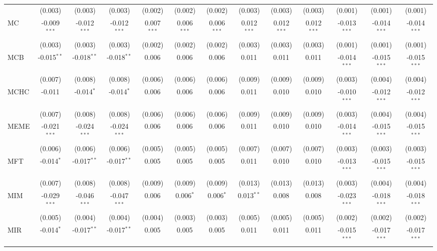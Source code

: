 \begin{table}[!htbp]
\begin{tabular}{@{\extracolsep{5pt}}lcccccccccccc}
  & (0.003) & (0.003) & (0.003) & (0.002) & (0.002) & (0.002) & (0.003) & (0.003) & (0.003) & (0.001) & (0.001) & (0.001) \\
 MC & -0.009$^{***}$ & -0.012$^{***}$ & -0.012$^{***}$ & 0.007$^{***}$ & 0.006$^{***}$ & 0.006$^{***}$ & 0.012$^{***}$ & 0.012$^{***}$ & 0.012$^{***}$ & -0.013$^{***}$ & -0.014$^{***}$ & -0.014$^{***}$ \\
  & (0.003) & (0.003) & (0.003) & (0.002) & (0.002) & (0.002) & (0.003) & (0.003) & (0.003) & (0.001) & (0.001) & (0.001) \\
 MCB & -0.015$^{**}$ & -0.018$^{**}$ & -0.018$^{**}$ & 0.006$^{}$ & 0.006$^{}$ & 0.006$^{}$ & 0.011$^{}$ & 0.011$^{}$ & 0.011$^{}$ & -0.014$^{***}$ & -0.015$^{***}$ & -0.015$^{***}$ \\
  & (0.007) & (0.008) & (0.008) & (0.006) & (0.006) & (0.006) & (0.009) & (0.009) & (0.009) & (0.003) & (0.004) & (0.004) \\
 MCHC & -0.011$^{}$ & -0.014$^{*}$ & -0.014$^{*}$ & 0.006$^{}$ & 0.006$^{}$ & 0.006$^{}$ & 0.011$^{}$ & 0.010$^{}$ & 0.010$^{}$ & -0.010$^{***}$ & -0.012$^{***}$ & -0.012$^{***}$ \\
  & (0.007) & (0.008) & (0.008) & (0.006) & (0.006) & (0.006) & (0.009) & (0.009) & (0.009) & (0.003) & (0.004) & (0.004) \\
 MEME & -0.021$^{***}$ & -0.024$^{***}$ & -0.024$^{***}$ & 0.006$^{}$ & 0.006$^{}$ & 0.006$^{}$ & 0.011$^{}$ & 0.010$^{}$ & 0.010$^{}$ & -0.014$^{***}$ & -0.015$^{***}$ & -0.015$^{***}$ \\
  & (0.006) & (0.006) & (0.006) & (0.005) & (0.005) & (0.005) & (0.007) & (0.007) & (0.007) & (0.003) & (0.003) & (0.003) \\
 MFT & -0.014$^{*}$ & -0.017$^{**}$ & -0.017$^{**}$ & 0.005$^{}$ & 0.005$^{}$ & 0.005$^{}$ & 0.011$^{}$ & 0.010$^{}$ & 0.010$^{}$ & -0.013$^{***}$ & -0.015$^{***}$ & -0.015$^{***}$ \\
  & (0.007) & (0.008) & (0.008) & (0.009) & (0.009) & (0.009) & (0.013) & (0.013) & (0.013) & (0.003) & (0.004) & (0.004) \\
 MIM & -0.029$^{***}$ & -0.046$^{***}$ & -0.047$^{***}$ & 0.006$^{}$ & 0.006$^{*}$ & 0.006$^{*}$ & 0.013$^{**}$ & 0.008$^{}$ & 0.008$^{}$ & -0.023$^{***}$ & -0.018$^{***}$ & -0.018$^{***}$ \\
  & (0.005) & (0.004) & (0.004) & (0.004) & (0.003) & (0.003) & (0.005) & (0.005) & (0.005) & (0.002) & (0.002) & (0.002) \\
 MIR & -0.014$^{*}$ & -0.017$^{**}$ & -0.017$^{**}$ & 0.005$^{}$ & 0.005$^{}$ & 0.005$^{}$ & 0.011$^{}$ & 0.011$^{}$ & 0.011$^{}$ & -0.015$^{***}$ & -0.017$^{***}$ & -0.017$^{***}$ \\

\end{tabular}
\end{table}
